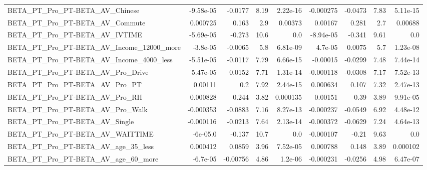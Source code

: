 \begin{tabular}{lrrrrrrrr}
BETA\_PT\_Pro\_PT-BETA\_AV\_Chinese                     &   -9.58e-05 &      -0.0177 &      8.19 & 2.22e-16 &  -0.000275 &     -0.0473 &         7.83 &      5.11e-15 \\
BETA\_PT\_Pro\_PT-BETA\_AV\_Commute                     &    0.000725 &        0.163 &       2.9 &  0.00373 &    0.00167 &       0.281 &          2.7 &       0.00688 \\
BETA\_PT\_Pro\_PT-BETA\_AV\_IVTIME                      &   -5.69e-05 &       -0.273 &      10.6 &      0.0 &  -8.94e-05 &      -0.341 &         9.61 &           0.0 \\
BETA\_PT\_Pro\_PT-BETA\_AV\_Income\_12000\_more           &    -3.8e-05 &      -0.0065 &       5.8 & 6.81e-09 &    4.7e-05 &      0.0075 &          5.7 &      1.23e-08 \\
BETA\_PT\_Pro\_PT-BETA\_AV\_Income\_4000\_less            &   -5.51e-05 &      -0.0117 &      7.79 & 6.66e-15 &   -0.00015 &     -0.0299 &         7.48 &      7.44e-14 \\
BETA\_PT\_Pro\_PT-BETA\_AV\_Pro\_Drive                   &    5.47e-05 &       0.0152 &      7.71 & 1.31e-14 &  -0.000118 &     -0.0308 &         7.17 &      7.52e-13 \\
BETA\_PT\_Pro\_PT-BETA\_AV\_Pro\_PT                      &     0.00111 &          0.2 &      7.92 & 2.44e-15 &   0.000634 &       0.107 &         7.32 &      2.47e-13 \\
BETA\_PT\_Pro\_PT-BETA\_AV\_Pro\_RH                      &    0.000828 &        0.244 &      3.82 & 0.000135 &    0.00151 &        0.39 &         3.89 &      9.91e-05 \\
BETA\_PT\_Pro\_PT-BETA\_AV\_Pro\_Walk                    &   -0.000353 &      -0.0883 &      7.16 & 8.27e-13 &  -0.000237 &     -0.0549 &         6.92 &      4.48e-12 \\
BETA\_PT\_Pro\_PT-BETA\_AV\_Single                      &   -0.000116 &      -0.0213 &      7.64 & 2.13e-14 &  -0.000372 &     -0.0629 &         7.24 &      4.64e-13 \\
BETA\_PT\_Pro\_PT-BETA\_AV\_WAITTIME                    &    -6e-05.0 &       -0.137 &      10.7 &      0.0 &  -0.000107 &       -0.21 &         9.63 &           0.0 \\
BETA\_PT\_Pro\_PT-BETA\_AV\_age\_35\_less                 &    0.000412 &       0.0859 &      3.96 & 7.52e-05 &   0.000788 &       0.148 &         3.89 &      0.000102 \\
BETA\_PT\_Pro\_PT-BETA\_AV\_age\_60\_more                 &    -6.7e-05 &     -0.00756 &      4.86 &  1.2e-06 &  -0.000231 &     -0.0256 &         4.98 &      6.47e-07 \\

\end{tabular}
